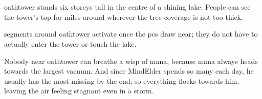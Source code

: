 \section{}
\label{oathtower}

\Gls{oathtower} stands six storeys tall in the centre of a shining lake.
People can see the tower's top for miles around wherever the tree coverage is not too thick.

\Glspl{segment} around \gls{oathtower} activate once the \glspl{pc} draw near; they do not have to actually enter the tower or touch the lake.

Nobody near \gls{oathtower} can breathe a wisp of mana, because mana always heads towards the largest vacuum.
And since \gls{MindElder} spends so many  each day, he usually has the most missing by the end; so everything flocks towards him, leaving the air feeling stagnant even in a storm.


